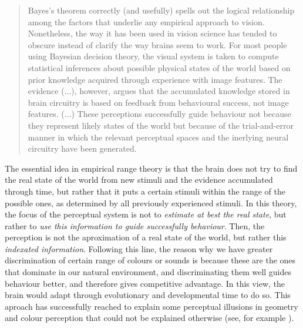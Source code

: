 \documentclass[
		twoside,openright,titlepage,numbers=noenddot,manychapters,
		headinclude,%
                footinclude=false,cleardoublepage=empty,
                BCOR=5mm,
		fontsize=11pt, %
                 enabledeprecatedfontcommands]{scrreprt}
\begin{document}
\begin{quote}

Bayes's theorem correctly (and usefully) spells out the logical relationship among the factors that underlie any empirical approach to vision. Nonetheless, the way it has been used in vision science has tended to obscure instead of clarify the way brains seem to work. For most people using Bayesian decision theory, the visual system is taken to compute statistical inferences about possible physical states of the world based on prior knowledge acquired through experience with image features. The evidence (...), however, argues that the accumulated knowledge stored in brain circuitry is based on feedback from behavioural success, not image features. (...) These perceptions successfully guide behaviour not because they represent likely states of the world but because of the trial-and-error manner in which the relevant perceptual spaces and the inerlying neural circuitry have been generated.

\end{quote}

The essential idea in empirical range theory is that the brain does not try to find the real state of the world from new stimuli and the evidence accumulated through time, but rather that it puts a certain stimuli within the range of the possible ones, as determined by all previously experienced stimuli. In this theory, the focus of the perceptual system is not to \emph{estimate at best the real state}, but rather to \emph{use this information to guide successfully behaviour}.  Then, the perception is not the aproximation of a real state of the world, but rather this \emph{indexated information}. Following this line, the reason why we have greater discrimination of certain range of colours or sounds is because these are the ones that dominate in our natural environment, and discriminating them well guides behaviour better, and therefore gives competitive advantage. In this view, the brain would adapt through evolutionary and developmental time to do so. This aproach has successfully reached to explain some perceptual illusions in geometry and colour perception that could not be explained otherwise (see, for example  \cite{howe2005a,howe2005}). 
\end{document}
